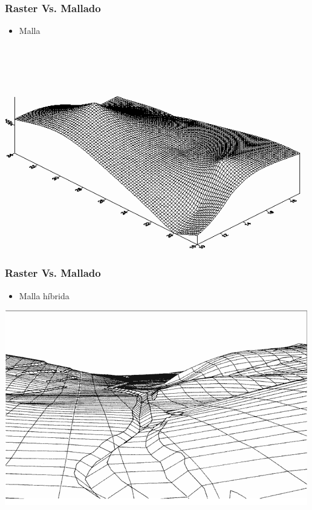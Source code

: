 \begin{frame}
  \frametitle{Raster Vs. Mallado}
  \begin{itemize}
    \item Malla 
  \end{itemize}
  \begin{center}
        \includegraphics[height=0.60\textheight]{images/mallado}
  \end{center}
\end{frame}
\begin{frame}
  \frametitle{Raster Vs. Mallado}
  \begin{itemize}
    \item Malla híbrida 
  \end{itemize}
  \begin{center}
        \includegraphics[height=0.60\textheight]{images/malla_breaklines}
  \end{center}
\end{frame}

